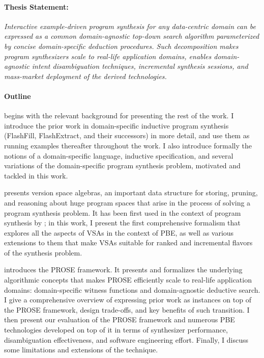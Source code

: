 \paragraph{Thesis Statement:}
\emph{
    Interactive example-driven program synthesis for any data-centric domain can be expressed as a common
    domain-agnostic top-down search algorithm parameterized by concise domain-specific deduction procedures.
    Such decomposition makes program synthesizers scale to real-life application domains, enables domain-agnostic
    intent disambiguation techniques, incremental synthesis sessions, and mass-market deployment of the derived
    technologies.
}

\paragraph{Outline}
 begins with the relevant background for presenting the rest of the work.
I introduce the prior work in domain-specific inductive program synthesis (FlashFill, FlashExtract, and their
successors) in more detail, and use them as running examples thereafter throughout the work.
I also introduce formally the notions of a domain-specific language, inductive specification, and several variations of
the domain-specific program synthesis problem, motivated and tackled in this work.

 presents version space algebras, an important data structure for storing, pruning, and reasoning about
huge program spaces that arise in the process of solving a program synthesis problem.
It has been first used in the context of program synthesis by \citet{lau:smartedit}; in this work, I present the
first comprehensive formalism that explores all the aspects of VSAs in the context of PBE, as well as various extensions
to them that make VSAs suitable for ranked and incremental flavors of the synthesis problem.

 introduces the PROSE framework.
It presents and formalizes the underlying algorithmic concepts that makes PROSE efficiently scale to real-life
application domains: domain-specific witness functions and domain-agnostic deductive search.
I give a comprehensive overview of expressing prior work as instances on top of the PROSE framework, design trade-offs,
and key benefits of such transition.
I then present our evaluation of the PROSE framework and numerous PBE technologies developed on top of it in terms of
synthesizer performance, disambiguation effectiveness, and software engineering effort.
Finally, I discuss some limitations and extensions of the technique.

